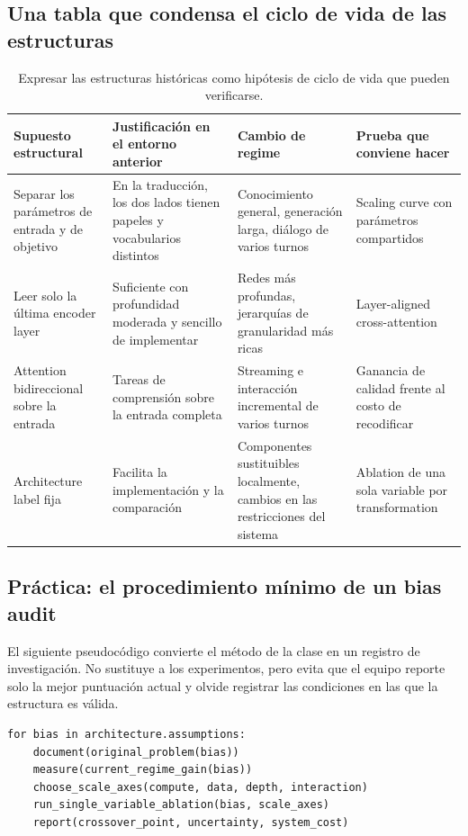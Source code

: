 \documentclass[a4paper]{article}
\begin{document}
\subsection{Una tabla que condensa el ciclo de vida de las estructuras}

\begin{table}[H]
\centering
\small
\begin{tabular}{@{}L{0.17\textwidth}L{0.24\textwidth}L{0.24\textwidth}L{0.25\textwidth}@{}}
\toprule
Supuesto estructural & Justificación en el entorno anterior & Cambio de regime & Prueba que conviene hacer \\
\midrule
Separar los parámetros de entrada y de objetivo & En la traducción, los dos lados tienen papeles y vocabularios distintos & Conocimiento general, generación larga, diálogo de varios turnos & Scaling curve con parámetros compartidos \\
Leer solo la última encoder layer & Suficiente con profundidad moderada y sencillo de implementar & Redes más profundas, jerarquías de granularidad más ricas & Layer-aligned cross-attention \\
Attention bidireccional sobre la entrada & Tareas de comprensión sobre la entrada completa & Streaming e interacción incremental de varios turnos & Ganancia de calidad frente al costo de recodificar \\
Architecture label fija & Facilita la implementación y la comparación & Componentes sustituibles localmente, cambios en las restricciones del sistema & Ablation de una sola variable por transformation \\
\bottomrule
\end{tabular}
\caption{Expresar las estructuras históricas como hipótesis de ciclo de vida que pueden verificarse.}
\end{table}

\subsection{Práctica: el procedimiento mínimo de un bias audit}

El siguiente pseudocódigo convierte el método de la clase en un registro de investigación. No sustituye a los experimentos, pero evita que el equipo reporte solo la mejor puntuación actual y olvide registrar las condiciones en las que la estructura es válida.

\begin{lstlisting}[caption={Plantilla de registro de investigación para un inductive-bias audit}]
for bias in architecture.assumptions:
    document(original_problem(bias))
    measure(current_regime_gain(bias))
    choose_scale_axes(compute, data, depth, interaction)
    run_single_variable_ablation(bias, scale_axes)
    report(crossover_point, uncertainty, system_cost)
\end{lstlisting}
\end{document}
